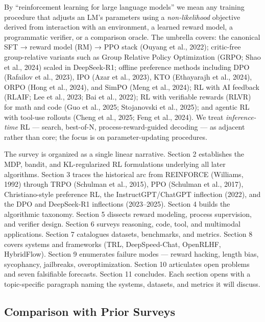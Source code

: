 By ``reinforcement learning for large language models'' we mean any training procedure that adjusts an LM's parameters using a \emph{non-likelihood} objective derived from interaction with an environment, a learned reward model, a programmatic verifier, or a comparison oracle. The umbrella covers: the canonical SFT → reward model (RM) → PPO stack (Ouyang et al., 2022); critic-free group-relative variants such as Group Relative Policy Optimization (GRPO; Shao et al., 2024) scaled in DeepSeek-R1; offline preference methods including DPO (Rafailov et al., 2023), IPO (Azar et al., 2023), KTO (Ethayarajh et al., 2024), ORPO (Hong et al., 2024), and SimPO (Meng et al., 2024); RL with AI feedback (RLAIF; Lee et al., 2023; Bai et al., 2022); RL with verifiable rewards (RLVR) for math and code (Guo et al., 2025; Stojanovski et al., 2025); and agentic RL with tool-use rollouts (Cheng et al., 2025; Feng et al., 2024). We treat \emph{inference-time} RL --- search, best-of-N, process-reward-guided decoding --- as adjacent rather than core; the focus is on parameter-updating procedures.

The survey is organized as a single linear narrative. Section 2 establishes the MDP, bandit, and KL-regularized RL formulations underlying all later algorithms. Section 3 traces the historical arc from REINFORCE (Williams, 1992) through TRPO (Schulman et al., 2015), PPO (Schulman et al., 2017), Christiano-style preference RL, the InstructGPT/ChatGPT inflection (2022), and the DPO and DeepSeek-R1 inflections (2023--2025). Section 4 builds the algorithmic taxonomy. Section 5 dissects reward modeling, process supervision, and verifier design. Section 6 surveys reasoning, code, tool, and multimodal applications. Section 7 catalogues datasets, benchmarks, and metrics. Section 8 covers systems and frameworks (TRL, DeepSpeed-Chat, OpenRLHF, HybridFlow). Section 9 enumerates failure modes --- reward hacking, length bias, sycophancy, jailbreaks, overoptimization. Section 10 articulates open problems and seven falsifiable forecasts. Section 11 concludes. Each section opens with a topic-specific paragraph naming the systems, datasets, and metrics it will discuss.

\subsection{Comparison with Prior Surveys}\label{comparison-with-prior-surveys}


